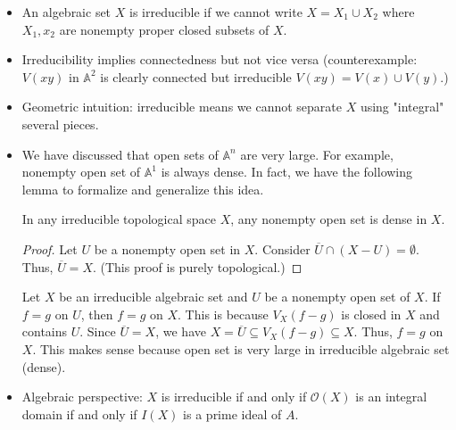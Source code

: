 \documentclass[15pt]{scrartcl}
\newcommand{\A}{\mathbb{A}}
\begin{document}
\begin{itemize}
    \subsection{Irreducibility}
    \item An algebraic set $X$ is irreducible if we cannot write $X=X_1\cup X_2$ where $X_1, x_2$ are nonempty proper closed subsets of $X$. 
    \item Irreducibility implies connectedness but not vice versa (counterexample: $V(xy)$ in $\A^2$ is clearly connected but irreducible $V(xy)=V(x)\cup V(y)$.)
    \\
    \item Geometric intuition: irreducible means we cannot separate $X$ using "integral" several pieces. 
    \item We have discussed that open sets of $\A^n$ are very large. For example, nonempty open set of $\A^1$ is always dense. In fact, we have the following lemma to formalize and generalize this idea. 
    \begin{lemma}
        In any irreducible topological space $X$, any nonempty open set is dense in $X$. 
    \end{lemma}
    \begin{proof}
        Let $U$ be a nonempty open set in $X$. Consider $\overline{U}\cap (X-U)=\emptyset$. Thus, $\overline{U}=X$. (This proof is purely topological.)
    \end{proof}
    \begin{remark}
        Let $X$ be an irreducible algebraic set and $U$ be a nonempty open set of $X$. If $f=g$ on $U$, then $f=g$ on $X$. This is because $V_X(f-g)$ is closed in $X$ and contains $U$. Since $\overline{U}=X$, we have $X=\overline{U}\subseteq V_X(f-g)\subseteq X$. Thus, $f=g$ on $X$. This makes sense because open set is very large in irreducible algebraic set (dense).
    \end{remark}
    \item Algebraic perspective: $X$ is irreducible if and only if $\mathcal{O}(X)$ is an integral domain if and only if $I(X)$ is a prime ideal of $A$. 
    \\


\end{itemize}
\end{document}
